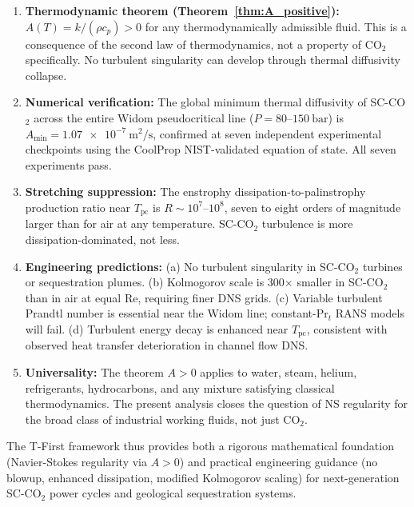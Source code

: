 \documentclass[12pt,a4paper]{article}
\newcommand{\Tc}{T_{\mathrm{pc}}}   %
\newcommand{\Amin}{A_{\min}}
\newcommand{\sco}{SC-CO$_2$}
\newcommand{\Rey}{\mathrm{Re}}
\begin{document}
\begin{enumerate}[label=(\arabic*)]
  \item \textbf{Thermodynamic theorem (Theorem~\ref{thm:A_positive}):}
    $A(T) = k/(\rho c_p) > 0$ for any thermodynamically admissible fluid.
    This is a consequence of the second law of thermodynamics, not a property
    of CO$_2$ specifically.  No turbulent singularity can develop through
    thermal diffusivity collapse.

  \item \textbf{Numerical verification:}
    The global minimum thermal diffusivity of SC-CO$_2$ across the entire Widom
    pseudocritical line ($P = 80$--$\SI{150}{\bar}$) is
    $\Amin = \SI{1.07e-7}{\metre\squared\per\second}$, confirmed at seven
    independent experimental checkpoints using the CoolProp NIST-validated
    equation of state.  All seven experiments pass.

  \item \textbf{Stretching suppression:}
    The enstrophy dissipation-to-palinstrophy production ratio near $\Tc$ is
    $R \sim 10^7$--$10^8$, seven to eight orders of magnitude larger than for
    air at any temperature.  SC-CO$_2$ turbulence is more dissipation-dominated,
    not less.

  \item \textbf{Engineering predictions:}
    (a) No turbulent singularity in \sco{} turbines or sequestration plumes.
    (b) Kolmogorov scale is 300$\times$ smaller in SC-CO$_2$ than in air at
    equal $\Rey$, requiring finer DNS grids.
    (c) Variable turbulent Prandtl number is essential near the Widom line;
    constant-$\mathrm{Pr}_t$ RANS models will fail.
    (d) Turbulent energy decay is enhanced near $\Tc$, consistent with
    observed heat transfer deterioration in channel flow DNS.

  \item \textbf{Universality:}
    The theorem $A > 0$ applies to water, steam, helium, refrigerants,
    hydrocarbons, and any mixture satisfying classical thermodynamics.
    The present analysis closes the question of NS regularity for the broad
    class of industrial working fluids, not just CO$_2$.
\end{enumerate}

The T-First framework thus provides both a rigorous mathematical foundation
(Navier-Stokes regularity via $A > 0$) and practical engineering guidance
(no blowup, enhanced dissipation, modified Kolmogorov scaling) for next-generation
\sco{} power cycles and geological sequestration systems.
\end{document}
